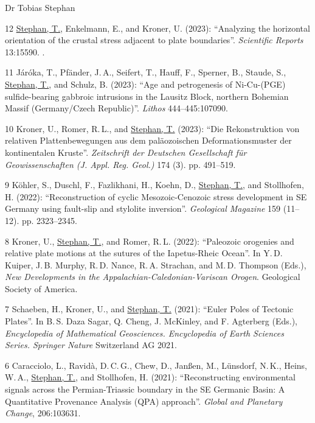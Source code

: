 \documentclass[10pt, paper=letter]{scrartcl} %
\begin{document}
\begin{cv}{\textsf{Dr Tobias Stephan}}
\begin{cvlist}{}
        \item[12] \ul{Stephan, T.}, Enkelmann, E., and Kroner, U. (2023): \enquote{Analyzing the horizontal orientation of the crustal stress adjacent to plate boundaries}. \textit{Scientific Reports} 13:15590. .
        \item[11] Járóka, T.,  Pfänder, J.\,A., Seifert, T., Hauff, F., Sperner, B., Staude, S., \ul{Stephan, T.}, and Schulz, B. (2023): \enquote{Age and petrogenesis of Ni-Cu-(PGE) sulfide-bearing gabbroic intrusions in the Lausitz Block, northern Bohemian Massif (Germany/Czech Republic)}. \textit{Lithos} 444--445:107090. 
        \item[10] Kroner, U., Romer, R.\,L., and \ul{Stephan, T.} (2023): \enquote{Die Rekonstruktion von relativen Plattenbewegungen aus dem paläozoischen Deformationsmuster der kontinentalen Kruste}. \textit{Zeitschrift der Deutschen Gesellschaft für Geowissenschaften (J. Appl. Reg. Geol.)} 174 (3). pp. 491--519. 
        \item[9] K\"ohler, S., Duschl, F., Fazlikhani, H., Koehn, D., \ul{Stephan, T.}, and Stollhofen, H. (2022): \enquote{Reconstruction of cyclic Mesozoic-Cenozoic stress development in SE Germany using fault-slip and stylolite inversion}. \textit{Geological Magazine} 159 (11--12). pp. 2323--2345.\newline
        \item[8] Kroner, U., \ul{Stephan, T.}, and Romer, R.\,L. (2022): \enquote{Paleozoic orogenies and relative plate motions at the sutures of the Iapetus-Rheic Ocean}. In Y.\,D. Kuiper, J.\,B. Murphy, R.\,D. Nance, R.\,A. Strachan, and M.\,D. Thompson (Eds.), \textit{New Developments in the Appalachian-Caledonian-Variscan Orogen}. Geological Society of America. 
        \item[7] Schaeben, H., Kroner, U., and \ul{Stephan, T.} (2021): \enquote{Euler Poles of Tectonic Plates}. In B.\,S. Daza Sagar, Q. Cheng, J. McKinley, and F. Agterberg (Eds.), \textit{Encyclopedia of Mathematical Geosciences. Encyclopedia of Earth Sciences Series. Springer Nature} Switzerland AG 2021. 
        \item[6] Caracciolo, L., Ravid\`a, D.\,C.\,G., Chew, D., Jan{\ss}en, M., L\"unsdorf, N.\,K., Heins, W.\,A., \ul{Stephan, T.}, and Stollhofen, H. (2021): \enquote{Reconstructing environmental signals across the Permian-Triassic boundary in the SE Germanic Basin: A Quantitative Provenance Analysis (QPA) approach}. \textit{Global and Planetary Change}, 206:103631.  

\end{cvlist}
\end{cv}
\end{document}
